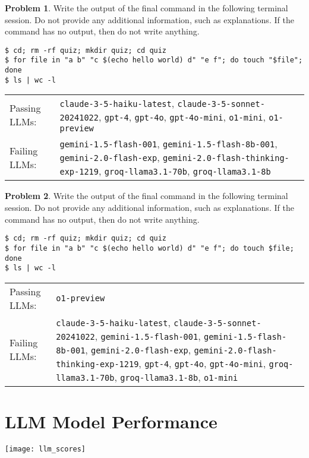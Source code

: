 \documentclass[10pt]{article}
\theoremstyle{definition}
\newtheorem{problem}{Problem}
\begin{document}
\begin{samepage}

\begin{problem}
Write the output of the final command in the following terminal session.
Do not provide any additional information,
such as explanations.
If the command has no output,
then do not write anything.

\end{problem}
\begin{lstlisting}
$ cd; rm -rf quiz; mkdir quiz; cd quiz
$ for file in "a b" "c $(echo hello world) d" "e f"; do touch "$file"; done
$ ls | wc -l
\end{lstlisting}


\noindent
\begin{tabular}{p{1.0in}L{5in}}
Passing LLMs: & {\lstinline$claude-3-5-haiku-latest$}, {\lstinline$claude-3-5-sonnet-20241022$}, {\lstinline$gpt-4$}, {\lstinline$gpt-4o$}, {\lstinline$gpt-4o-mini$}, {\lstinline$o1-mini$}, {\lstinline$o1-preview$} \\
Failing LLMs: & {\lstinline$gemini-1.5-flash-001$}, {\lstinline$gemini-1.5-flash-8b-001$}, {\lstinline$gemini-2.0-flash-exp$}, {\lstinline$gemini-2.0-flash-thinking-exp-1219$}, {\lstinline$groq-llama3.1-70b$}, {\lstinline$groq-llama3.1-8b$} \\
\end{tabular}

\end{samepage}
\begin{samepage}

\begin{problem}
Write the output of the final command in the following terminal session.
Do not provide any additional information,
such as explanations.
If the command has no output,
then do not write anything.

\end{problem}
\begin{lstlisting}
$ cd; rm -rf quiz; mkdir quiz; cd quiz
$ for file in "a b" "c $(echo hello world) d" "e f"; do touch $file; done
$ ls | wc -l
\end{lstlisting}


\noindent
\begin{tabular}{p{1.0in}L{5in}}
Passing LLMs: & {\lstinline$o1-preview$} \\
Failing LLMs: & {\lstinline$claude-3-5-haiku-latest$}, {\lstinline$claude-3-5-sonnet-20241022$}, {\lstinline$gemini-1.5-flash-001$}, {\lstinline$gemini-1.5-flash-8b-001$}, {\lstinline$gemini-2.0-flash-exp$}, {\lstinline$gemini-2.0-flash-thinking-exp-1219$}, {\lstinline$gpt-4$}, {\lstinline$gpt-4o$}, {\lstinline$gpt-4o-mini$}, {\lstinline$groq-llama3.1-70b$}, {\lstinline$groq-llama3.1-8b$}, {\lstinline$o1-mini$} \\
\end{tabular}

\end{samepage}

\section*{LLM Model Performance}
\texttt{[image: llm\_scores]}
\end{document}
